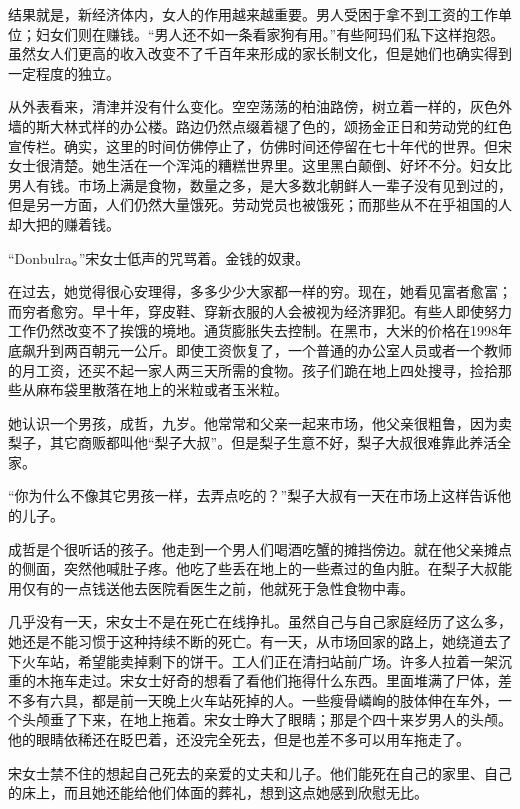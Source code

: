 结果就是，新经济体内，女人的作用越来越重要。男人受困于拿不到工资的工作单位；妇女们则在赚钱。“男人还不如一条看家狗有用。”有些阿玛们私下这样抱怨。虽然女人们更高的收入改变不了千百年来形成的家长制文化，但是她们也确实得到一定程度的独立。

从外表看来，清津并没有什么变化。空空荡荡的柏油路傍，树立着一样的，灰色外墙的斯大林式样的办公楼。路边仍然点缀着褪了色的，颂扬金正日和劳动党的红色宣传栏。确实，这里的时间仿佛停止了，仿佛时间还停留在七十年代的世界。但宋女士很清楚。她生活在一个浑沌的糟糕世界里。这里黑白颠倒、好坏不分。妇女比男人有钱。市场上满是食物，数量之多，是大多数北朝鲜人一辈子没有见到过的，但是另一方面，人们仍然大量饿死。劳动党员也被饿死；而那些从不在乎祖国的人却大把的赚着钱。

“Donbulra。”宋女士低声的咒骂着。金钱的奴隶。

在过去，她觉得很心安理得，多多少少大家都一样的穷。现在，她看见富者愈富；而穷者愈穷。早十年，穿皮鞋、穿新衣服的人会被视为经济罪犯。有些人即使努力工作仍然改变不了挨饿的境地。通货膨胀失去控制。在黑市，大米的价格在1998年底飙升到两百朝元一公斤。即使工资恢复了，一个普通的办公室人员或者一个教师的月工资，还买不起一家人两三天所需的食物。孩子们跪在地上四处搜寻，捡拾那些从麻布袋里散落在地上的米粒或者玉米粒。

她认识一个男孩，成哲，九岁。他常常和父亲一起来市场，他父亲很粗鲁，因为卖梨子，其它商贩都叫他“梨子大叔”。但是梨子生意不好，梨子大叔很难靠此养活全家。

“你为什么不像其它男孩一样，去弄点吃的？”梨子大叔有一天在市场上这样告诉他的儿子。

成哲是个很听话的孩子。他走到一个男人们喝酒吃蟹的摊挡傍边。就在他父亲摊点的侧面，突然他喊肚子疼。他吃了些丢在地上的一些煮过的鱼内脏。在梨子大叔能用仅有的一点钱送他去医院看医生之前，他就死于急性食物中毒。

几乎没有一天，宋女士不是在死亡在线挣扎。虽然自己与自己家庭经历了这么多，她还是不能习惯于这种持续不断的死亡。有一天，从市场回家的路上，她绕道去了下火车站，希望能卖掉剩下的饼干。工人们正在清扫站前广场。许多人拉着一架沉重的木拖车走过。宋女士好奇的想看了看他们拖得什么东西。里面堆满了尸体，差不多有六具，都是前一天晚上火车站死掉的人。一些瘦骨嶙峋的肢体伸在车外，一个头颅垂了下来，在地上拖着。宋女士睁大了眼睛；那是个四十来岁男人的头颅。他的眼睛依稀还在眨巴着，还没完全死去，但是也差不多可以用车拖走了。

宋女士禁不住的想起自己死去的亲爱的丈夫和儿子。他们能死在自己的家里、自己的床上，而且她还能给他们体面的葬礼，想到这点她感到欣慰无比。
